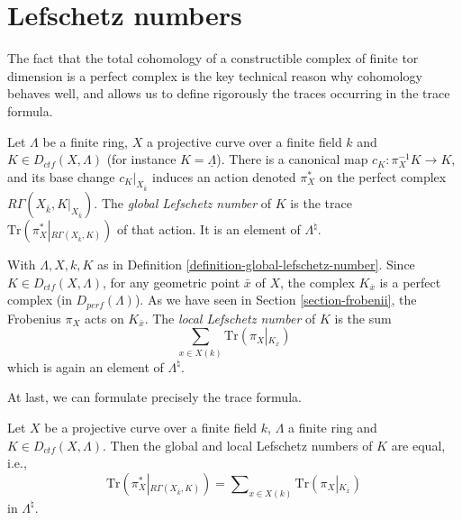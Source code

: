 \section{Lefschetz numbers}
\label{section-lefschetz-numbers}

\noindent
The fact that the total cohomology of a constructible complex of finite tor
dimension is a perfect complex is the key technical reason why cohomology
behaves well, and allows us to define rigorously the traces occurring in the
trace formula.

\begin{definition}
\label{definition-global-lefschetz-number}
Let $\Lambda$ be a finite ring, $X$ a projective curve over a finite field $k$
and $K \in D_{ctf}(X, \Lambda)$ (for instance $K = \underline\Lambda$).
There is a canonical map $c_K : \pi_X^{-1}K \to K$, and its base change
$c_K|_{X_{\bar k}}$ induces an action denoted $\pi_X^*$ on the perfect
complex $R\Gamma(X_{\bar k}, K|_{X_{\bar k}})$. The
{\it global Lefschetz number} of $K$ is the trace $
\text{Tr}(\pi_X^*\left|_{R\Gamma(X_{\bar k}, K)}\right.)$ of that action.
It is an element of $\Lambda^\natural$.
\end{definition}

\begin{definition}
\label{definition-local-lefschetz-number}
With $\Lambda, X, k, K$ as in
Definition \ref{definition-global-lefschetz-number}.
Since $K\in D_{ctf}(X, \Lambda)$, for any geometric point $\bar x$ of $X$,
the complex $K_{\bar x}$ is a perfect complex (in $D_{perf}(\Lambda)$). As we
have seen in Section \ref{section-frobenii}, the Frobenius $\pi_X$ acts on
$K_{\bar x}$. The {\it local Lefschetz number} of $K$ is the sum
$$
\sum_{x\in X(k)} \text{Tr}(\pi_X \left|_{K_{\overline x}}\right.)
$$
which is again an element of $\Lambda^\natural$.
\end{definition}

\noindent
At last, we can formulate precisely the trace formula.

\begin{theorem}
\label{theorem-trace}
Let $X$ be a projective curve over a finite field $k$, $\Lambda$ a finite ring
and $K \in D_{ctf}(X, \Lambda)$. Then the global and local Lefschetz numbers
of $K$ are equal, i.e.,
\begin{equation}
\label{equation-trace-formula}
\text{Tr}(\pi^*_X\left|_{R\Gamma(X_{\bar k}, K)}\right.)
=
\sum\nolimits_{x\in X(k)} \text{Tr}(\pi_X\left|_{K_{\bar x}}\right.)
\end{equation}
in $\Lambda^\natural$.
\end{theorem}

